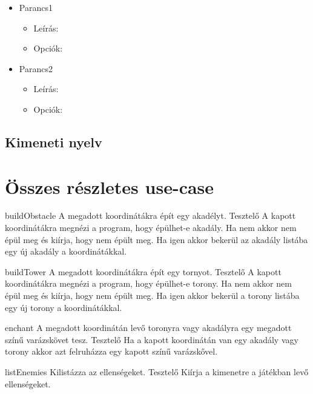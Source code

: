 \begin{itemize}
\item Parancs1
	\begin{itemize}
	\item Leírás:
	\item Opciók:
	\end{itemize}
\item Parancs2
	\begin{itemize}
	\item Leírás:
	\item Opciók:
	\end{itemize}

\end{itemize}


\subsection{Kimeneti nyelv}

\section{Összes részletes use-case}

\usecase
{buildObstacle}
{A megadott koordinátákra épít egy akadélyt.}
{Tesztelő}
{A kapott koordinátákra megnézi a program, hogy épülhet-e akadály. Ha nem akkor nem épül meg és kiírja, hogy nem épült meg.
Ha igen akkor bekerül az akadály listába egy új akadály a koordinátákkal.}

\usecase
{buildTower}
{A megadott koordinátákra épít egy tornyot.}
{Tesztelő}
{A kapott koordinátákra megnézi a program, hogy épülhet-e torony. Ha nem akkor nem épül meg és kiírja, hogy nem épült meg.
Ha igen akkor bekerül a torony listába egy új torony a koordinátákkal.}

\usecase
{enchant}
{A megadott koordinátán levő toronyra vagy akadályra egy megadott színű varázskövet tesz. }
{Tesztelő}
{Ha a kapott koordinátán van egy akadály vagy torony akkor azt felruházza egy kapott színű varázskővel.}

\usecase
{listEnemies}
{Kilistázza az ellenségeket.}
{Tesztelő}
{Kiírja a kimenetre a játékban levő ellenségeket.}

